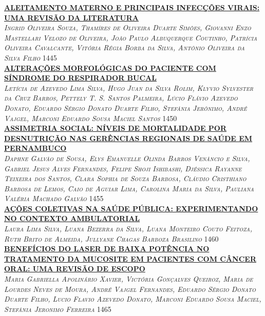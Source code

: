 \noindent \textsc{\hyperlink{trabalhos/251706.pdf.1}{\textbf{ALEITAMENTO MATERNO E PRINCIPAIS INFECÇÕES VIRAIS: UMA REVISÃO DA LITERATURA}}}\\ 
\noindent \textsc{\textit{Ingrid Oliveira Souza, Thamíres de Oliveira Duarte Simões, Giovanni Enzo Mastellari Velozo de Oliveira, João Paulo Albuquerque Coutinho, Patrícia Oliveira Cavalcante, Vitória Régia Borba da Silva, Antônio Oliveira da Silva Filho}} \hfill 1445\\ 

\noindent \textsc{\hyperlink{trabalhos/250042.pdf.1}{\textbf{ALTERAÇÕES MORFOLÓGICAS DO PACIENTE COM SÍNDROME DO RESPIRADOR BUCAL}}}\\ 
\noindent \textsc{\textit{Letícia de Azevedo Lima Silva, Hugo Juan da Silva Rolim, Klyvio Sylvester da Cruz Barros, Pettely T. S. Santos Palmeira, Lúcio Flávio Azevedo Donato, Eduardo Sérgio Donato Duarte Filho, Stefânia Jerônimo, André Vajgel, Marconi Eduardo Sousa Maciel Santos}} \hfill 1450\\ 

\noindent \textsc{\hyperlink{trabalhos/250124.pdf.1}{\textbf{ASSIMETRIA SOCIAL: NÍVEIS DE MORTALIDADE POR DESNUTRIÇÃO NAS GERÊNCIAS REGIONAIS DE SAÚDE EM PERNAMBUCO}}}\\ 
\noindent \textsc{\textit{Daphne Galvão de Sousa, Elys Emanuelle Olinda Barros Venâncio e Silva, Gabriel Jesus Alves Fernandes, Felipe Shoji Ishibashi, Djéssica Rayanne Teixeira dos Santos, Clara Sophia de Souza Barbosa, Cláudio Cristhiano Barbosa de Lemos, Caio de Aguiar Lima, Carolina Maria da Silva, Pauliana Valéria Machado Galvão}} \hfill 1455\\ 

\noindent \textsc{\hyperlink{trabalhos/250186.pdf.1}{\textbf{AÇÕES COLETIVAS NA SAÚDE PÚBLICA: EXPERIMENTANDO NO CONTEXTO AMBULATORIAL}}}\\ 
\noindent \textsc{\textit{Laura Lima Silva, Luana Bezerra da Silva, Luana Monteiro Couto Feitoza, Ruth Brito de Almeida, Jullyane Chagas Barboza Brasilino}} \hfill 1460\\ 

\noindent \textsc{\hyperlink{trabalhos/251516.pdf.1}{\textbf{BENEFÍCIOS DO LASER DE BAIXA POTÊNCIA NO TRATAMENTO DA MUCOSITE EM PACIENTES COM CÂNCER ORAL: UMA REVISÃO DE ESCOPO}}}\\ 
\noindent \textsc{\textit{Maria Gabriella Apolinário Xavier, Victória Gonçalves Queiroz, Maria de Lourdes Neves de Moura, André Vajgel Fernandes, Eduardo Sérgio Donato Duarte Filho, Lucio Flavio Azevedo Donato, Marconi Eduardo Sousa Maciel, Stefânia Jeronimo Ferreira}} \hfill 1465\\ 

